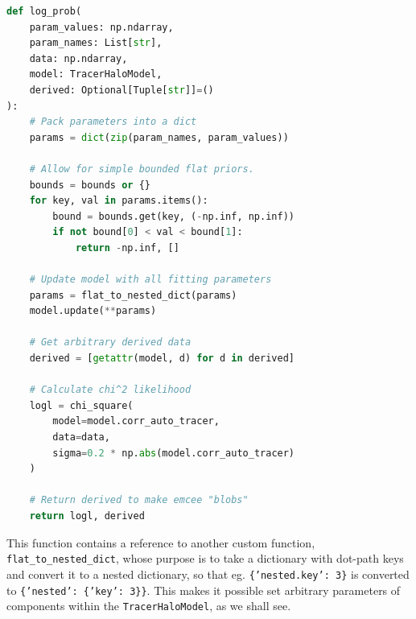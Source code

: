 \documentclass[5p,aas_macros]{elsarticle}
\begin{document}
%    
%            
%
%
%    
\begin{lstlisting}[language=Python]
def log_prob(
	param_values: np.ndarray, 
	param_names: List[str], 
	data: np.ndarray,
	model: TracerHaloModel, 
	derived: Optional[Tuple[str]]=()
):
	# Pack parameters into a dict
	params = dict(zip(param_names, param_values))

	# Allow for simple bounded flat priors.
	bounds = bounds or {}
	for key, val in params.items():
		bound = bounds.get(key, (-np.inf, np.inf))
		if not bound[0] < val < bound[1]:
			return -np.inf, []

	# Update model with all fitting parameters 
	params = flat_to_nested_dict(params)
	model.update(**params)
	
	# Get arbitrary derived data
	derived = [getattr(model, d) for d in derived]
	
	# Calculate chi^2 likelihood
	logl = chi_square(
		model=model.corr_auto_tracer, 
		data=data, 
		sigma=0.2 * np.abs(model.corr_auto_tracer)
	)
	
	# Return derived to make emcee "blobs"
	return logl, derived
\end{lstlisting}

This function contains a reference to another custom function, \verb|flat_to_nested_dict|, whose purpose is to take a dictionary with 
dot-path keys and convert it to a nested dictionary, so that eg. \texttt{\{'nested.key': 3\}} is converted to \texttt{\{'nested': \{'key': 3\}\}}. This makes it possible set arbitrary parameters of components within the \texttt{Tracer\-Halo\-Model}, as we shall see. 
\end{document}
